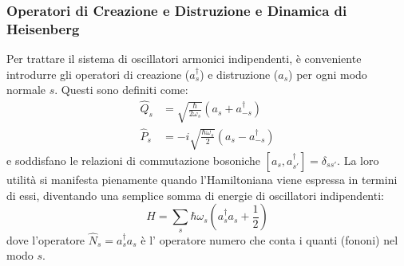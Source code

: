 


\subsubsection{Operatori di Creazione e Distruzione e Dinamica di Heisenberg}

Per trattare il sistema di oscillatori armonici indipendenti, è conveniente introdurre gli operatori di creazione ($a_s^\dagger$) e distruzione ($a_s$)  per ogni modo normale $s$. Questi sono definiti come:
\begin{align}
    \hat{Q}_s &= \sqrt{\frac{\hbar}{2\omega_s}} (a_s + a_{-s}^\dagger) \\
    \hat{P}_s &= -i\sqrt{\frac{\hbar\omega_s}{2}} (a_s - a_{-s}^\dagger)
\end{align}
e soddisfano le relazioni di commutazione bosoniche $[a_s, a_{s'}^\dagger] = \delta_{ss'}$. La loro utilità si manifesta pienamente quando l'Hamiltoniana viene espressa in termini di essi, diventando una semplice somma di energie di oscillatori indipendenti:
\begin{equation}
    H = \sum_s \hbar\omega_s \left( a_s^\dagger a_s + \frac{1}{2} \right)
\end{equation}
dove l'operatore $\hat{N}_s = a_s^\dagger a_s$ è l' operatore numero  che conta i quanti (fononi) nel modo $s$.

